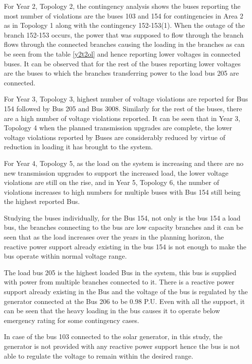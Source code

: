 \documentclass[10pt]{report}
\begin{document}
For Year 2, Topology 2, the contingency analysis shows the buses reporting the most number of violations are the buses 103 and 154 for contingencies in Area 2 as in Topology 1 along with the contingency 152-153(1). When the outage of the branch 152-153 occurs, the power that was supposed to flow through the branch flows through the connected branches causing the loading in the branches as can be seen from the table \ref{y2t2ol} and hence reporting lower voltages in connected buses. It can be observed that for the rest of the buses reporting lower voltages are the buses to which the branches transferring power to the load bus 205 are connected. 

For Year 3, Topology 3, highest number of voltage violations are reported for Bus 154 followed by Bus 205 and Bus 3008. Similarly for the rest of the buses, there are a high number of voltage violations reported. It can be seen that in Year 3, Topology 4 when the planned  transmission upgrades are complete, the lower voltage violations reported by Buses are considerably reduced by virtue of reduction in loading it has brought to the system. 

For Year 4, Topology 5, as the load on the system is increasing and there are no new transmission upgrades to support the increased load, the lower voltage violations are still on the rise, and in Year 5, Topology 6, the number of violations increases to high numbers for multiple buses with Bus 154 still being the highest reported Bus. 

Studying the buses individually, for the Bus 154, not only is the bus 154 a load bus, the branches connecting to the bus are low capacity branches and it can be seen that as the load increases over the years in the planning horizon, the reactive power support already existing in the bus 154 is not enough to make the bus operate within normal voltage range.

The load bus 205 is the highest loaded Bus in the system, this bus is supplied with power from multiple branches connected to it. There is a reactive power support already existing in the Bus and the voltage of the bus is regulated by the generator connected at the Bus 206 to be 0.98 P.U. Even with all the support, it can be seen that the heavy loading in the bus causes it to operate below emergency rating for some contingency cases. 

In case of the bus 103 connected to the solar generator, in this study, the generator is not provided with any reactive power support hence the bus is not able to regulate the voltage to remain within the desired range. 
\end{document}
